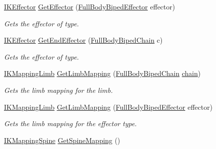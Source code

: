 \begin{DoxyCompactItemize}
\mbox{\hyperlink{class_root_motion_1_1_final_i_k_1_1_i_k_effector}{I\+K\+Effector}} \mbox{\hyperlink{class_root_motion_1_1_final_i_k_1_1_i_k_solver_full_body_biped_abc623c1247452620c8ea22e61b0dce89}{Get\+Effector}} (\mbox{\hyperlink{namespace_root_motion_1_1_final_i_k_ae0dd2058c7667b6f132c11a6b860c14a}{Full\+Body\+Biped\+Effector}} effector)
\begin{DoxyCompactList}\small\item\em Gets the effector of type. \end{DoxyCompactList}\item 
\mbox{\hyperlink{class_root_motion_1_1_final_i_k_1_1_i_k_effector}{I\+K\+Effector}} \mbox{\hyperlink{class_root_motion_1_1_final_i_k_1_1_i_k_solver_full_body_biped_adaa6dd3c41880d13564d6c018784cea5}{Get\+End\+Effector}} (\mbox{\hyperlink{namespace_root_motion_1_1_final_i_k_ae8848c0353270a08dcfe8b85a5c9b761}{Full\+Body\+Biped\+Chain}} c)
\begin{DoxyCompactList}\small\item\em Gets the effector of type. \end{DoxyCompactList}\item 
\mbox{\hyperlink{class_root_motion_1_1_final_i_k_1_1_i_k_mapping_limb}{I\+K\+Mapping\+Limb}} \mbox{\hyperlink{class_root_motion_1_1_final_i_k_1_1_i_k_solver_full_body_biped_a08e166778ae50b5057cc91daaabf58b7}{Get\+Limb\+Mapping}} (\mbox{\hyperlink{namespace_root_motion_1_1_final_i_k_ae8848c0353270a08dcfe8b85a5c9b761}{Full\+Body\+Biped\+Chain}} \mbox{\hyperlink{class_root_motion_1_1_final_i_k_1_1_i_k_solver_full_body_aae6ec635c069329275bd5e3eb18dac41}{chain}})
\begin{DoxyCompactList}\small\item\em Gets the limb mapping for the limb. \end{DoxyCompactList}\item 
\mbox{\hyperlink{class_root_motion_1_1_final_i_k_1_1_i_k_mapping_limb}{I\+K\+Mapping\+Limb}} \mbox{\hyperlink{class_root_motion_1_1_final_i_k_1_1_i_k_solver_full_body_biped_ae2ed6739b99204e848db21e42153e9d7}{Get\+Limb\+Mapping}} (\mbox{\hyperlink{namespace_root_motion_1_1_final_i_k_ae0dd2058c7667b6f132c11a6b860c14a}{Full\+Body\+Biped\+Effector}} effector)
\begin{DoxyCompactList}\small\item\em Gets the limb mapping for the effector type. \end{DoxyCompactList}\item 
\mbox{\hyperlink{class_root_motion_1_1_final_i_k_1_1_i_k_mapping_spine}{I\+K\+Mapping\+Spine}} \mbox{\hyperlink{class_root_motion_1_1_final_i_k_1_1_i_k_solver_full_body_biped_a9f9ed1a8e3f75029e096cf2602ea635e}{Get\+Spine\+Mapping}} ()

\end{DoxyCompactItemize}
